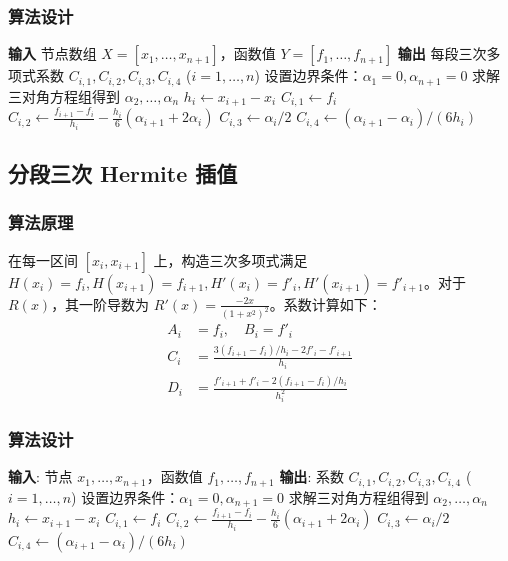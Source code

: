 \documentclass{article}
\begin{document}
\subsubsection{算法设计}
\begin{algorithm}[H]
\caption{计算自然样条插值函数}
\begin{algorithmic}[1]
    \STATE \textbf{输入} 节点数组 $X = [x_1, \dots, x_{n+1}]$，函数值 $Y = [f_1, \dots, f_{n+1}]$
    \STATE \textbf{输出} 每段三次多项式系数 $C_{i,1}, C_{i,2}, C_{i,3}, C_{i,4}$ ($i=1, \dots, n$)
    \STATE 设置边界条件：$\alpha_1 = 0, \alpha_{n+1} = 0$
    \STATE 求解三对角方程组得到 $\alpha_2, \dots, \alpha_n$
        \STATE $h_i \leftarrow x_{i+1} - x_i$
        \STATE $C_{i,1} \leftarrow f_i$
        \STATE $C_{i,2} \leftarrow \frac{f_{i+1} - f_i}{h_i} - \frac{h_i}{6}(\alpha_{i+1} + 2\alpha_i)$
        \STATE $C_{i,3} \leftarrow \alpha_i / 2$
        \STATE $C_{i,4} \leftarrow (\alpha_{i+1} - \alpha_i) / (6h_i)$
    \ENDFOR
\end{algorithmic}
\end{algorithm}

\subsection{分段三次 Hermite 插值}
\subsubsection{算法原理}
在每一区间 $[x_i, x_{i+1}]$ 上，构造三次多项式满足 $H(x_i)=f_i, H(x_{i+1})=f_{i+1}, H'(x_i)=f'_i, H'(x_{i+1})=f'_{i+1}$。对于 $R(x)$，其一阶导数为 $R'(x) = \frac{-2x}{(1+x^2)^2}$。系数计算如下：
\begin{align*}
    A_i &= f_i, \quad B_i = f'_i \\
    C_i &= \frac{3(f_{i+1}-f_i)/h_i - 2f'_i - f'_{i+1}}{h_i} \\
    D_i &= \frac{f'_{i+1} + f'_i - 2(f_{i+1}-f_i)/h_i}{h_i^2}
\end{align*}

\subsubsection{算法设计}
\begin{algorithm}[H]
\caption{计算三次Hermite插值多项式}
\begin{algorithmic}[1]
    \STATE \textbf{输入}: 节点 $x_1, \dots, x_{n+1}$，函数值 $f_1, \dots, f_{n+1}$
    \STATE \textbf{输出}: 系数 $C_{i,1}, C_{i,2}, C_{i,3}, C_{i,4}$ ($i=1, \dots, n$)
    \STATE 设置边界条件：$\alpha_1 = 0, \alpha_{n+1} = 0$
    \STATE 求解三对角方程组得到 $\alpha_2, \dots, \alpha_n$
        \STATE $h_i \leftarrow x_{i+1} - x_i$
        \STATE $C_{i,1} \leftarrow f_i$
        \STATE $C_{i,2} \leftarrow \frac{f_{i+1} - f_i}{h_i} - \frac{h_i}{6}(\alpha_{i+1} + 2\alpha_i)$
        \STATE $C_{i,3} \leftarrow \alpha_i / 2$
        \STATE $C_{i,4} \leftarrow (\alpha_{i+1} - \alpha_i) / (6h_i)$
    \ENDFOR
\end{algorithmic}
\end{algorithm}
\end{document}
